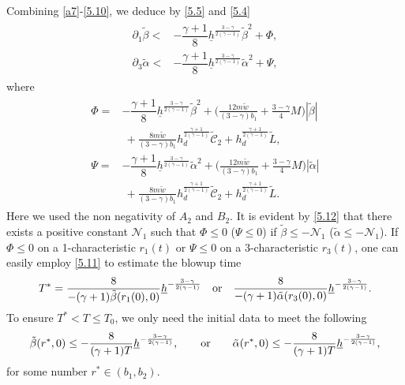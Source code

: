\documentclass[11pt,reqno]{article}
\newcommand{\fr}{\frac}
\newcommand{\pa}{\partial}
\numberwithin{equation}{section}
\begin{document}
Combining \eqref{a7}-\eqref{5.10}, we deduce by \eqref{5.5} and \eqref{5.4}
\begin{align}\label{5.11}
\begin{split}
\pa_1 \tilde\beta <&-\dfrac{\gamma+1}{8}{\underline{h}}^{\fr{3-\gamma}{2(\gamma-1)}} \tilde{\beta}^{2}
   +\Phi, \\
\pa_3 \tilde\alpha <&-\dfrac{\gamma+1}{8}{\underline{h}}^{\fr{3-\gamma}{2(\gamma-1)}} \tilde{\alpha}^{2}
  +\Psi,
\end{split}
\end{align}
where
\begin{align}\label{5.12}
\begin{split}
\Phi=&-\dfrac{\gamma+1}{8}{\underline{h}}^{\fr{3-\gamma}{2(\gamma-1)}} \tilde{\beta}^{2} +\Big(\fr{12m\tilde{w}}{(3-\gamma)b_1} + \fr{3-\gamma}{4}M \Big)|\tilde\beta| \\ &\ +\fr{8m\tilde{w}}{(3-\gamma)b_1}h_{d}^{\fr{\gamma+1}{2(\gamma-1)}}\widetilde{\mathcal{C}}_2 +h_{d}^{\fr{\gamma+1}{2(\gamma-1)}} \widetilde{L}, \\
\Psi=&-\dfrac{\gamma+1}{8}{\underline{h}}^{\fr{3-\gamma}{2(\gamma-1)}} \tilde{\alpha}^{2} +\Big(\fr{12m\tilde{w}}{(3-\gamma)b_1} + \fr{3-\gamma}{4}M \Big)|\tilde\alpha| \\ &\ +\fr{8m\tilde{w}}{(3-\gamma)b_1}h_{d}^{\fr{\gamma+1}{2(\gamma-1)}}\widetilde{\mathcal{C}}_2 +h_{d}^{\fr{\gamma+1}{2(\gamma-1)}} \widetilde{L}.
\end{split}
\end{align}
Here we used the non negativity of $A_2$ and $B_2$. It is evident by \eqref{5.12} that there exists a positive constant $\mathcal{N}_1$ such that $\Phi\leq0$ ($\Psi\leq0$) if $\tilde\beta\leq -\mathcal{N}_1$ ($\tilde\alpha\leq -\mathcal{N}_1$). If $\Phi\leq0$ on a 1-characteristic $r_1(t)$ or $\Psi\leq0$ on a 3-characteristic $r_3(t)$, one can easily employ \eqref{5.11} to estimate the blowup time
\begin{align*}
T^*=\fr{8}{-(\gamma+1)\tilde\beta(r_1(0),0)}\underline{h}^{-\fr{3-\gamma}{2(\gamma-1)}}\quad {\rm or}\quad \fr{8}{-(\gamma+1)\tilde\alpha(r_3(0),0)}\underline{h}^{-\fr{3-\gamma}{2(\gamma-1)}}.
\end{align*}
To ensure $T^*<T\leq T_0$, we only need the initial data to meet the following
\begin{align}\label{5.13}
\tilde\beta(r^*,0)\leq -\fr{8}{(\gamma+1)T}\underline{h}^{-\fr{3-\gamma}{2(\gamma-1)}}, \qquad {\rm or}\qquad \tilde\alpha(r^*,0)\leq -\fr{8}{(\gamma+1)T}\underline{h}^{-\fr{3-\gamma}{2(\gamma-1)}},
\end{align}
for some number $r^*\in(b_1,b_2)$.
\end{document}
